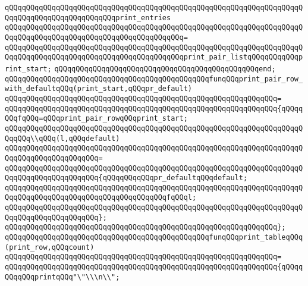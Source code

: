 \verb|qQQqqQQqqQQqqQQqqQQqqQQqqQQqqQQqqQQqqQQqqQQqqQQqqQQqqQQqqQQqqQQqqQQqqQQqqQQqqQQqqQQqqQQqqQQqqQQqprint_entries|\newline
\verb|qQQqqQQqqQQqqQQqqQQqqQQqqQQqqQQqqQQqqQQqqQQqqQQqqQQqqQQqqQQqqQQqqQQqqQQqqQQqqQQqqQQqqQQqqQQqqQQqqQQqqQQqqQQqqQQq=|\newline
\verb|qQQqqQQqqQQqqQQqqQQqqQQqqQQqqQQqqQQqqQQqqQQqqQQqqQQqqQQqqQQqqQQqqQQqqQQqqQQqqQQqqQQqqQQqqQQqqQQqqQQqqQQqqQQqqQQqprint_pair_listqQQqqQQqqQQqprint_start;|\newline
\verb|qQQqqQQqqQQqqQQqqQQqqQQqqQQqqQQqqQQqqQQqqQQqqQQqend;|\newline
\newline
\verb|qQQqqQQqqQQqqQQqqQQqqQQqqQQqqQQqqQQqqQQqqQQqqQQqfunqQQqprint_pair_row_with_defaultqQQq(print_start,qQQqpr_default)|\newline
\verb|qQQqqQQqqQQqqQQqqQQqqQQqqQQqqQQqqQQqqQQqqQQqqQQqqQQqqQQqqQQqqQQq=|\newline
\verb|qQQqqQQqqQQqqQQqqQQqqQQqqQQqqQQqqQQqqQQqqQQqqQQqqQQqqQQqqQQqqQQq{qQQqqQQqfqQQq=qQQqprint_pair_rowqQQqprint_start;|\newline
\newline
\verb|qQQqqQQqqQQqqQQqqQQqqQQqqQQqqQQqqQQqqQQqqQQqqQQqqQQqqQQqqQQqqQQqqQQqqQQqqQQq\\qQQq(l,qQQqdefault)|\newline
\verb|qQQqqQQqqQQqqQQqqQQqqQQqqQQqqQQqqQQqqQQqqQQqqQQqqQQqqQQqqQQqqQQqqQQqqQQqqQQqqQQqqQQqqQQqqQQq=|\newline
\verb|qQQqqQQqqQQqqQQqqQQqqQQqqQQqqQQqqQQqqQQqqQQqqQQqqQQqqQQqqQQqqQQqqQQqqQQqqQQqqQQqqQQqqQQqqQQq{qQQqqQQqqQQqpr_defaultqQQqdefault;|\newline
\verb|qQQqqQQqqQQqqQQqqQQqqQQqqQQqqQQqqQQqqQQqqQQqqQQqqQQqqQQqqQQqqQQqqQQqqQQqqQQqqQQqqQQqqQQqqQQqqQQqqQQqqQQqqQQqfqQQql;|\newline
\verb|qQQqqQQqqQQqqQQqqQQqqQQqqQQqqQQqqQQqqQQqqQQqqQQqqQQqqQQqqQQqqQQqqQQqqQQqqQQqqQQqqQQqqQQqqQQq};|\newline
\verb|qQQqqQQqqQQqqQQqqQQqqQQqqQQqqQQqqQQqqQQqqQQqqQQqqQQqqQQqqQQqqQQq};|\newline
\newline
\verb|qQQqqQQqqQQqqQQqqQQqqQQqqQQqqQQqqQQqqQQqqQQqqQQqfunqQQqprint_tableqQQq(print_row,qQQqcount)|\newline
\verb|qQQqqQQqqQQqqQQqqQQqqQQqqQQqqQQqqQQqqQQqqQQqqQQqqQQqqQQqqQQqqQQq=|\newline
\verb|qQQqqQQqqQQqqQQqqQQqqQQqqQQqqQQqqQQqqQQqqQQqqQQqqQQqqQQqqQQqqQQq{qQQqqQQqqQQqprintqQQq"\"\\\n\\";|\newline
